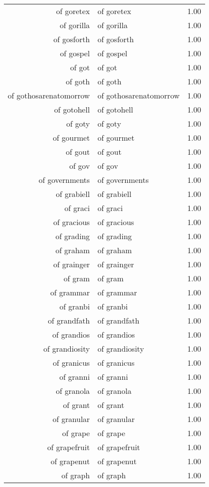 \begin{table}[ht]
\begin{tabular}{rlr}
  of goretex & of goretex & 1.00 \\ 
  of gorilla & of gorilla & 1.00 \\ 
  of gosforth & of gosforth & 1.00 \\ 
  of gospel & of gospel & 1.00 \\ 
  of got & of got & 1.00 \\ 
  of goth & of goth & 1.00 \\ 
  of gothosarenatomorrow & of gothosarenatomorrow & 1.00 \\ 
  of gotohell & of gotohell & 1.00 \\ 
  of goty & of goty & 1.00 \\ 
  of gourmet & of gourmet & 1.00 \\ 
  of gout & of gout & 1.00 \\ 
  of gov & of gov & 1.00 \\ 
  of governments & of governments & 1.00 \\ 
  of grabiell & of grabiell & 1.00 \\ 
  of graci & of graci & 1.00 \\ 
  of gracious & of gracious & 1.00 \\ 
  of grading & of grading & 1.00 \\ 
  of graham & of graham & 1.00 \\ 
  of grainger & of grainger & 1.00 \\ 
  of gram & of gram & 1.00 \\ 
  of grammar & of grammar & 1.00 \\ 
  of granbi & of granbi & 1.00 \\ 
  of grandfath & of grandfath & 1.00 \\ 
  of grandios & of grandios & 1.00 \\ 
  of grandiosity & of grandiosity & 1.00 \\ 
  of granicus & of granicus & 1.00 \\ 
  of granni & of granni & 1.00 \\ 
  of granola & of granola & 1.00 \\ 
  of grant & of grant & 1.00 \\ 
  of granular & of granular & 1.00 \\ 
  of grape & of grape & 1.00 \\ 
  of grapefruit & of grapefruit & 1.00 \\ 
  of grapenut & of grapenut & 1.00 \\ 
  of graph & of graph & 1.00 \\ 

\end{tabular}
\end{table}
